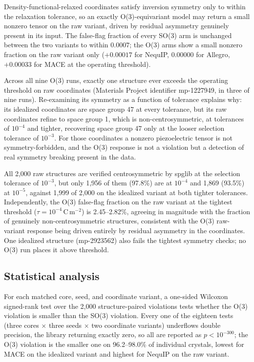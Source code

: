 Density-functional-relaxed coordinates satisfy inversion symmetry only to within the relaxation tolerance, so an exactly O(3)-equivariant model may return a small nonzero tensor on the raw variant, driven by residual asymmetry genuinely present in its input. The false-flag fraction of every SO(3) arm is unchanged between the two variants to within $0.0007$; the O(3) arms show a small nonzero fraction on the raw variant only ($+0.00017$ for NequIP, $0.00000$ for Allegro, $+0.00033$ for MACE at the operating threshold).

Across all nine O(3) runs, exactly one structure ever exceeds the operating threshold on raw coordinates (Materials Project identifier mp-1227949, in three of nine runs). Re-examining its symmetry as a function of tolerance explains why: its idealized coordinates are space group 47 at every tolerance, but its raw coordinates refine to space group 1, which is non-centrosymmetric, at tolerances of $10^{-4}$ and tighter, recovering space group 47 only at the looser selection tolerance of $10^{-3}$. For those coordinates a nonzero piezoelectric tensor is not symmetry-forbidden, and the O(3) response is not a violation but a detection of real symmetry breaking present in the data.

All 2,000 raw structures are verified centrosymmetric by spglib at the selection tolerance of $10^{-3}$, but only 1,956 of them (97.8\%) are at $10^{-4}$ and 1,869 (93.5\%) at $10^{-5}$, against 1,999 of 2,000 on the idealized variant at both tighter tolerances. Independently, the O(3) false-flag fraction on the raw variant at the tightest threshold ($\tau = 10^{-4}$\,C\,m$^{-2}$) is 2.45--2.82\%, agreeing in magnitude with the fraction of genuinely non-centrosymmetric structures, consistent with the O(3) raw-variant response being driven entirely by residual asymmetry in the coordinates. One idealized structure (mp-2923562) also fails the tightest symmetry checks; no O(3) run places it above threshold.

\subsection*{Statistical analysis}\label{snote:stats}

For each matched core, seed, and coordinate variant, a one-sided Wilcoxon signed-rank test over the 2,000 structure-paired violations tests whether the O(3) violation is smaller than the SO(3) violation. Every one of the eighteen tests (three cores $\times$ three seeds $\times$ two coordinate variants) underflows double precision, the library returning exactly zero, so all are reported as $p<10^{-300}$; the O(3) violation is the smaller one on 96.2--98.0\% of individual crystals, lowest for MACE on the idealized variant and highest for NequIP on the raw variant.

